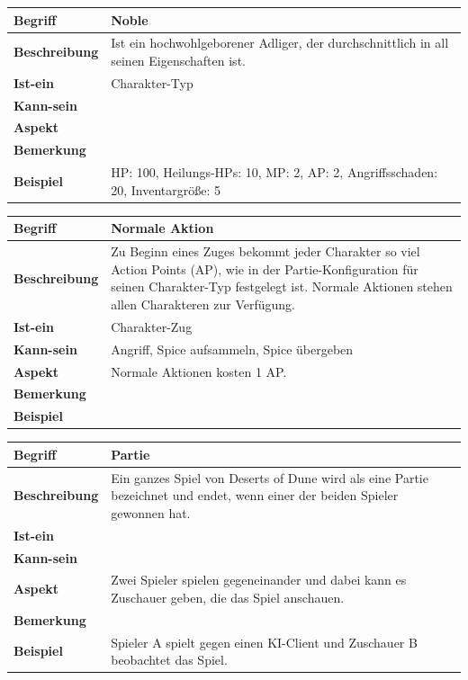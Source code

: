 \documentclass[12pt]{article}
\begin{document}
\begin{tabularx}{\linewidth}{|l|X|}
\hline
\textbf{Begriff} & \textbf{Noble} \\
\hline
\textbf{Beschreibung} & Ist ein hochwohlgeborener Adliger, der durchschnittlich in all seinen Eigenschaften ist.\\
\hline
\textbf{Ist-ein} & Charakter-Typ\\
\hline
\textbf{Kann-sein} & \\
\hline
\textbf{Aspekt} & \\
\hline
\textbf{Bemerkung} &  \\
\hline
\textbf{Beispiel} & HP: 100, Heilungs-HPs: 10, MP: 2, AP: 2, Angriffsschaden: 20, Inventargröße: 5 \\
\hline
\end{tabularx}

\begin{tabularx}{\linewidth}{|l|X|}
\hline
\textbf{Begriff} & \textbf{Normale Aktion} \\
\hline
\textbf{Beschreibung} & Zu Beginn eines Zuges bekommt jeder Charakter so viel Action Points (AP), wie in der Partie-Konfiguration für seinen Charakter-Typ festgelegt ist. Normale Aktionen stehen allen Charakteren zur Verfügung.\\
\hline
\textbf{Ist-ein} & Charakter-Zug\\
\hline
\textbf{Kann-sein} & Angriff, Spice aufsammeln, Spice übergeben\\
\hline
\textbf{Aspekt} & Normale Aktionen kosten 1 AP.\\
\hline
\textbf{Bemerkung} &  \\
\hline
\textbf{Beispiel} &  \\
\hline
\end{tabularx}

\begin{tabularx}{\linewidth}{|l|X|}
\hline
\textbf{Begriff} & \textbf{Partie} \\
\hline
\textbf{Beschreibung} & Ein ganzes Spiel von Deserts of Dune wird als eine Partie bezeichnet und endet, wenn einer der beiden Spieler gewonnen hat. \\
\hline
\textbf{Ist-ein} & \\
\hline
\textbf{Kann-sein} & \\
\hline
\textbf{Aspekt} & Zwei Spieler spielen gegeneinander und dabei kann es Zuschauer geben, die das Spiel anschauen.\\
\hline
\textbf{Bemerkung} &  \\
\hline
\textbf{Beispiel} & Spieler A spielt gegen einen KI-Client und Zuschauer B beobachtet das Spiel. \\
\hline
\end{tabularx}
\end{document}
